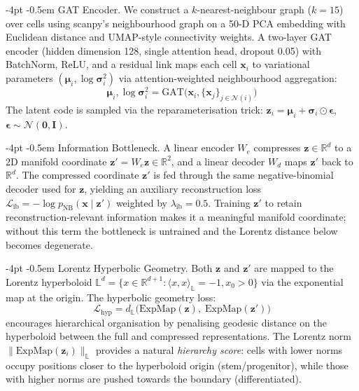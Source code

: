\documentclass[preprint,12pt]{elsarticle}
\makeatletter
\renewcommand\paragraph{\@startsection{paragraph}{4}{\z@}%
  {-4pt \@plus -1pt \@minus -1pt}%
  {-0.5em}%
  {\normalfont\normalsize\bfseries}}
\newcommand{\rea}{\mathbb{R}}
\newcommand{\lore}{\mathbb{L}}
\newcommand{\bx}{\mathbf{x}}
\newcommand{\bz}{\mathbf{z}}
\newcommand{\bmu}{\boldsymbol{\mu}}
\newcommand{\bsig}{\boldsymbol{\sigma}}
\makeatother
\begin{document}
\paragraph{GAT Encoder.}
We construct a $k$-nearest-neighbour graph ($k{=}15$) over cells
using scanpy's neighbourhood graph on a 50-D PCA embedding with
Euclidean distance and UMAP-style connectivity weights.
A two-layer GAT encoder (hidden dimension 128, single attention head,
dropout 0.05) with BatchNorm, ReLU, and a residual link maps each
cell $\bx_i$ to variational parameters $(\bmu_i, \log\bsig_i^2)$ via
attention-weighted neighbourhood aggregation:
\begin{equation}
  \bmu_i, \log\bsig_i^2 = \text{GAT}\bigl(\bx_i,
    \{\bx_j\}_{j \in \mathcal{N}(i)}\bigr)
\end{equation}
The latent code is sampled via the reparameterisation trick:
$\bz_i = \bmu_i + \bsig_i \odot \boldsymbol{\epsilon}$,
$\boldsymbol{\epsilon} \sim \mathcal{N}(\mathbf{0}, \mathbf{I})$.

\paragraph{Information Bottleneck.}
A linear encoder $W_e$ compresses $\bz \in \rea^d$ to a 2D manifold
coordinate $\bz' = W_e \bz \in \rea^2$, and a linear decoder
$W_d$ maps $\bz'$ back to $\rea^d$.
The compressed coordinate $\bz'$ is fed through the same negative-binomial
decoder used for $\bz$, yielding an auxiliary reconstruction loss
$\mathcal{L}_\text{ib} = -\log p_\text{NB}(\bx \mid \bz')$ weighted
by $\lambda_\text{ib}{=}0.5$.
Training $\bz'$ to retain reconstruction-relevant information makes
it a meaningful manifold coordinate; without this term the bottleneck
is untrained and the Lorentz distance below becomes degenerate.

\paragraph{Lorentz Hyperbolic Geometry.}
Both $\bz$ and $\bz'$ are mapped to the Lorentz hyperboloid
$\lore^d = \{x \in \rea^{d+1} : \langle x, x \rangle_\lore = -1,
x_0 > 0\}$
via the exponential map at the origin.
The hyperbolic geometry loss:
\begin{equation}
  \mathcal{L}_\text{hyp} = d_\lore\!\bigl(
    \text{ExpMap}(\bz),\;\text{ExpMap}(\bz')\bigr)
  \label{eq:hyp_loss}
\end{equation}
encourages hierarchical organisation by penalising geodesic distance
on the hyperboloid between the full and compressed representations.
The Lorentz norm $\lVert \text{ExpMap}(\bz_i) \rVert_\lore$ provides
a natural \emph{hierarchy score}: cells with lower norms occupy
positions closer to the hyperboloid origin (stem/progenitor), while
those with higher norms are pushed towards the boundary
(differentiated).
\end{document}
